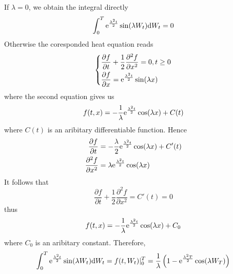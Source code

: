 \documentclass{homework}
\begin{document}
\begin{subproblem}[(\alph*)]
        \item
        If $\lambda=0$, we obtain the integral directly
        \renewcommand{\thisf}[1]{\e^{\frac{\lambda^2t}2}\sin(\lambda #1)}
        \[\int_0^T\thisf{W_t}\diff W_t=0\]
        Otherwise the coresponded heat equation reads
        \[\left\{\begin{aligned}
            &\frac{\partial f}{\partial t}+\frac{1}{2}\frac{\partial^2 f}{\partial x^2}=0,t\geq 0\\
            &\frac{\partial f}{\partial x}=\thisf{x}
        \end{aligned}\right.\]
        where the second equation gives us
        \[f(t,x)=-\frac{1}{\lambda}\mathrm e^{\frac{\lambda^2t}{2}}\cos(\lambda x)+C(t)\]
        where $C(t)$ is an aribitary differentiable function. Hence
        \[\begin{aligned}
            \frac{\partial f}{\partial t}&=-\frac{\lambda}{2}
            \mathrm e^{\frac{\lambda^2t}{2}}\cos(\lambda x)+C'(t)\\
            \frac{\partial^2f}{\partial x^2}&=\lambda\mathrm e^{\frac{\lambda^2t}{2}}\cos(\lambda x)
        \end{aligned}\]
        It follows that
        \[\frac{\partial f}{\partial t}+\frac{1}{2}\frac{\partial^2 f}{\partial x^2}
        =C'(t)=0\]
        thus
        \[f(t,x)=-\frac{1}{\lambda}\mathrm e^{\frac{\lambda^2t}{2}}\cos(\lambda x)+C_0\]
        where $C_0$ is an aribitary constant. Therefore,
        \[\int_0^T\thisf{W_t}\diff W_t=f(t,W_t)|_0^T
        =\frac{1}{\lambda}\left(1-\e^{\frac{\lambda^2T}{2}}\cos(\lambda W_T)\right)\]
    \end{subproblem}
\end{document}
